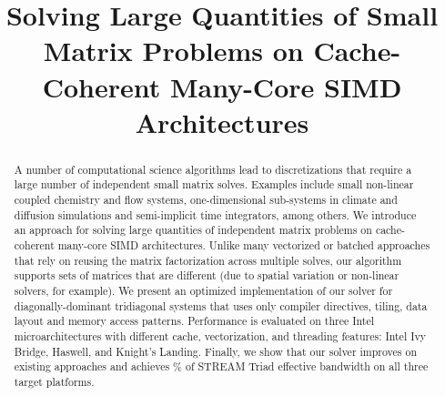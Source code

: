 \documentclass[10pt, conference, compsocconf]{IEEEtran}
\newcommand{\textapprox}{\texttildelow}
\begin{document}
\title{Solving Large Quantities of Small Matrix Problems on Cache-Coherent Many-Core SIMD Architectures}

\author{
}


\maketitle

\thispagestyle{plain}
\pagestyle{plain}

\begin{abstract}
A number of computational science algorithms lead to discretizations
  that require a large number of independent small matrix solves.
Examples include small non-linear coupled chemistry and flow systems,
  one-dimensional sub-systems in climate and diffusion simulations and 
  semi-implicit time integrators, among others.
We introduce an approach for solving large quantities of 
  independent matrix problems on cache-coherent many-core SIMD architectures.
Unlike many vectorized or batched approaches that rely on reusing
  the matrix factorization across multiple solves, our algorithm supports
  sets of matrices that are different (due to
  spatial variation or non-linear solvers, for example).
We present an optimized implementation of our solver for diagonally-dominant
  tridiagonal systems that uses only compiler directives, tiling, data layout
  and memory access patterns. 
Performance is evaluated on three Intel microarchitectures with different
  cache, vectorization, and threading features: Intel Ivy Bridge, Haswell, and
  Knight's Landing.
Finally, we show that our solver improves on existing approaches and achieves
  \textapprox 90\% of STREAM Triad effective bandwidth on all three target
  platforms. 
\end{abstract}
\end{document}
